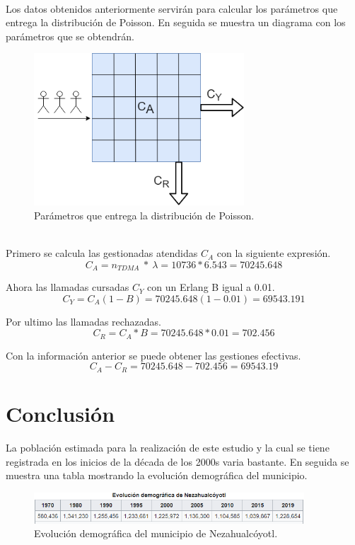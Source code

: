 \documentclass[11pt,letterpaper]{article}
\begin{document}
\\ 
Los datos obtenidos anteriormente servirán para calcular los parámetros que entrega 
la distribución de Poisson. En seguida se muestra un diagrama con los parámetros que se 
obtendrán.
\\ 
\begin{figure}[ht]
    \centering
    \includegraphics[width=0.7\textwidth]{imagenes/t34.png}
    \caption{Parámetros que entrega la distribución de Poisson.}
\end{figure}
\\ 
Primero se calcula las gestionadas atendidas $C_{A}$ con la siguiente expresión.
\begin{equation}
    C_A=n_{TDMA} \ * \ \lambda = 10736 * 6.543=70245.648
\end{equation}

Ahora las llamadas cursadas $C_Y$ con un Erlang B igual a 0.01.
\begin{equation}
    C_Y=C_A(1-B)=70245.648(1-0.01)=69543.191
\end{equation}

Por ultimo las llamadas rechazadas.
\begin{equation}
    C_R=C_A*B=70245.648*0.01=702.456
\end{equation}

Con la información anterior se puede obtener las gestiones efectivas.
\begin{equation}
    C_A-C_R=70245.648-702.456=69543.19
\end{equation}

\newpage
\section{Conclusión}
La población estimada para la realización de este estudio y la cual se tiene registrada 
en los inicios de la década de los 2000s varia bastante. En seguida se muestra una 
tabla mostrando la evolución demográfica del municipio.
\begin{figure}[ht]
    \centering
    \includegraphics[width=0.9\textwidth]{imagenes/t31.png}
    \caption{Evolución demográfica del municipio de Nezahualcóyotl.}
\end{figure}
\end{document}
